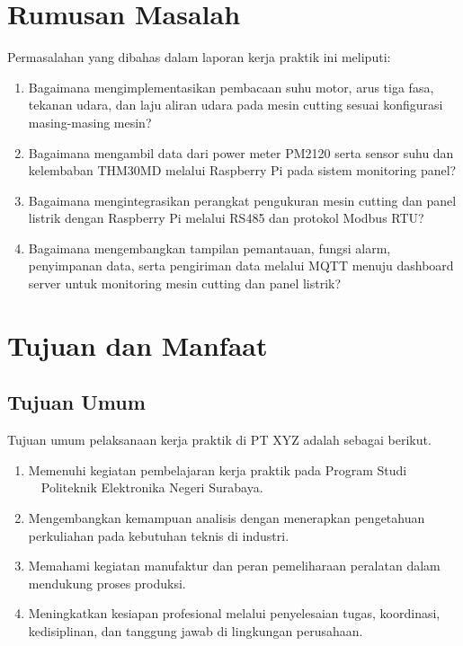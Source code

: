 \section{Rumusan Masalah}

Permasalahan yang dibahas dalam laporan kerja praktik ini meliputi:

\begin{enumerate}[leftmargin=*,itemsep=2pt]
\item Bagaimana mengimplementasikan pembacaan suhu motor, arus tiga fasa, tekanan udara, dan laju aliran udara pada mesin cutting sesuai konfigurasi masing-masing mesin?

\item Bagaimana mengambil data dari power meter PM2120 serta sensor suhu dan kelembaban THM30MD melalui Raspberry Pi pada sistem monitoring panel?

\item Bagaimana mengintegrasikan perangkat pengukuran mesin cutting dan panel listrik dengan Raspberry Pi melalui RS485 dan protokol Modbus RTU?

\item Bagaimana mengembangkan tampilan pemantauan, fungsi alarm, penyimpanan data, serta pengiriman data melalui MQTT menuju dashboard server untuk monitoring mesin cutting dan panel listrik?

\end{enumerate}

\section{Tujuan dan Manfaat}

\subsection{Tujuan Umum}

Tujuan umum pelaksanaan kerja praktik di PT XYZ adalah sebagai berikut.

\begin{enumerate}[leftmargin=*,itemsep=2pt]
\item Memenuhi kegiatan pembelajaran kerja praktik pada Program Studi \JenjangProdi\ \NamaProdi\ Politeknik Elektronika Negeri Surabaya.

\item Mengembangkan kemampuan analisis dengan menerapkan pengetahuan perkuliahan pada kebutuhan teknis di industri.

\item Memahami kegiatan manufaktur dan peran pemeliharaan peralatan dalam mendukung proses produksi.

\item Meningkatkan kesiapan profesional melalui penyelesaian tugas, koordinasi, kedisiplinan, dan tanggung jawab di lingkungan perusahaan.
\end{enumerate}

